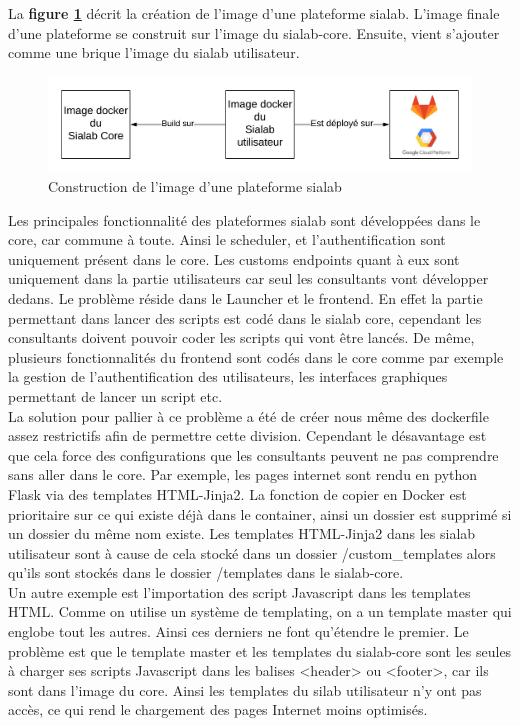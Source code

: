 \documentclass{article} %
\begin{document}
La \textbf{figure \ref{fig:siasia}} décrit la création de l'image d'une plateforme sialab. L'image finale d'une plateforme se construit sur l'image du sialab-core. Ensuite, vient s'ajouter comme une brique l'image du sialab utilisateur. 
\begin{figure}[!h]
	\centering
	\includegraphics[keepaspectratio = true,scale=0.6]{sia-core.png}
	\caption{Construction de l'image d'une plateforme sialab}
	\label{fig:siasia}
\end{figure}

Les principales fonctionnalité des plateformes sialab sont développées dans le core, car commune à toute. Ainsi le scheduler, et l'authentification sont uniquement présent dans le core. Les customs endpoints quant à eux sont uniquement dans la partie utilisateurs car seul les consultants vont développer dedans. Le problème réside dans le Launcher et le frontend. En effet la partie permettant dans lancer des scripts est codé dans le sialab core, cependant les consultants doivent pouvoir coder les scripts qui vont être lancés. De même, plusieurs fonctionnalités du frontend sont codés dans le core comme par exemple la gestion de l'authentification des utilisateurs, les interfaces graphiques permettant de lancer un script etc.\\

La solution pour pallier à ce problème a été de créer nous même des dockerfile assez restrictifs afin de permettre cette division. Cependant le désavantage est que cela force des configurations que les consultants peuvent ne pas comprendre sans aller dans le core. Par exemple, les pages internet sont rendu en python Flask via des templates HTML-Jinja2. La fonction de copier en Docker est prioritaire sur ce qui existe déjà dans le container, ainsi un dossier est supprimé si un dossier du même nom existe. Les templates HTML-Jinja2 dans les sialab utilisateur sont à cause de cela stocké dans un dossier /custom\_templates alors qu'ils sont stockés dans le dossier /templates dans le sialab-core.\\
Un autre exemple est l'importation des script Javascript dans les templates HTML. Comme on utilise un système de templating, on a un template master qui englobe tout les autres. Ainsi ces derniers ne font qu'étendre le premier. Le problème est que le template master et les templates du sialab-core sont les seules à charger ses scripts Javascript dans les balises <header> ou <footer>, car ils sont dans l'image du core. Ainsi les templates du silab utilisateur n'y ont pas accès, ce qui rend le chargement des pages Internet moins optimisés. 
\end{document}

